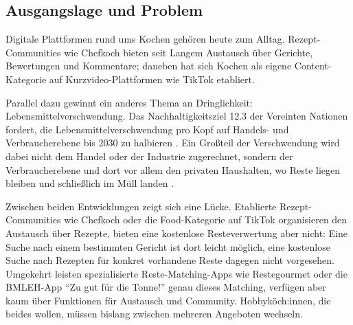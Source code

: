 \subsection{Ausgangslage und Problem}\label{sec:ausgangslage_und_problem}

Digitale Plattformen rund ums Kochen gehören heute zum Alltag. Rezept-Communities wie Chefkoch bieten seit Langem Austausch über Gerichte, Bewertungen und Kommentare; daneben hat sich Kochen als eigene Content-Kategorie auf Kurzvideo-Plattformen wie TikTok etabliert.

Parallel dazu gewinnt ein anderes Thema an Dringlichkeit: Lebensmittelverschwendung. Das Nachhaltigkeitsziel 12.3 der Vereinten Nationen fordert, die Lebensmittelverschwendung pro Kopf auf Handels- und Verbraucherebene bis 2030 zu halbieren \parencite[S. 22]{unTransformingOutWorld2030Agenda}. Ein Großteil der Verschwendung wird dabei nicht dem Handel oder der Industrie zugerechnet, sondern der Verbraucherebene und dort vor allem den privaten Haushalten, wo Reste liegen bleiben und schließlich im Müll landen \parencite[S. 105]{vittuariHowReduceConsumer2023}.

Zwischen beiden Entwicklungen zeigt sich eine Lücke. Etablierte Rezept-Communities wie Chefkoch oder die Food-Kategorie auf TikTok organisieren den Austausch über Rezepte, bieten eine kostenlose Resteverwertung aber nicht: Eine Suche nach einem bestimmten Gericht ist dort leicht möglich, eine kostenlose Suche nach Rezepten für konkret vorhandene Reste dagegen nicht vorgesehen. Umgekehrt leisten spezialisierte Reste-Matching-Apps wie Restegourmet oder die \ac{BMLEH}-App \enquote{Zu gut für die Tonne!} genau dieses Matching, verfügen aber kaum über Funktionen für Austausch und Community. Hobbyköch:innen, die beides wollen, müssen bislang zwischen mehreren Angeboten wechseln.
